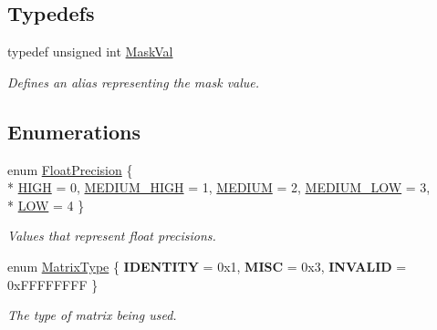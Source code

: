 \subsection*{Typedefs}
\begin{DoxyCompactItemize}
\item 
\hypertarget{group___scalar_math_consts_gad991473bd51363f9743013730e68751a}{}typedef unsigned int \hyperlink{group___scalar_math_consts_gad991473bd51363f9743013730e68751a}{Mask\+Val}\label{group___scalar_math_consts_gad991473bd51363f9743013730e68751a}

\begin{DoxyCompactList}\small\item\em Defines an alias representing the mask value. \end{DoxyCompactList}\end{DoxyCompactItemize}
\subsection*{Enumerations}
\begin{DoxyCompactItemize}
\item 
enum \hyperlink{group___scalar_math_consts_gae1c17f54b4cd35725ae7e4d54d5e8b8f}{Float\+Precision} \{ \\*
\hyperlink{group___scalar_math_consts_ggae1c17f54b4cd35725ae7e4d54d5e8b8fad850adf6415a0ab37b1c9fe6d3a50592}{H\+I\+G\+H} = 0, 
\hyperlink{group___scalar_math_consts_ggae1c17f54b4cd35725ae7e4d54d5e8b8faafc62be75ff50981d67b4fe3601020b3}{M\+E\+D\+I\+U\+M\+\_\+\+H\+I\+G\+H} = 1, 
\hyperlink{group___scalar_math_consts_ggae1c17f54b4cd35725ae7e4d54d5e8b8faae1748fe897ef72c65a32afb59edd9e9}{M\+E\+D\+I\+U\+M} = 2, 
\hyperlink{group___scalar_math_consts_ggae1c17f54b4cd35725ae7e4d54d5e8b8fab09c406decb8599d2aef4f9a60b7d46b}{M\+E\+D\+I\+U\+M\+\_\+\+L\+O\+W} = 3, 
\\*
\hyperlink{group___scalar_math_consts_ggae1c17f54b4cd35725ae7e4d54d5e8b8fa373b1e7676b2164a2da51003b901df10}{L\+O\+W} = 4
 \}
\begin{DoxyCompactList}\small\item\em Values that represent float precisions. \end{DoxyCompactList}\end{DoxyCompactItemize}
{\bf }\par
\begin{DoxyCompactItemize}
\item 
\hypertarget{group___s_i_s_d_mat_math_ga6c8951c82aec5015dd6806affb4c8d03}{}enum \hyperlink{group___s_i_s_d_mat_math_ga6c8951c82aec5015dd6806affb4c8d03}{Matrix\+Type} \{ {\bfseries I\+D\+E\+N\+T\+I\+T\+Y} = 0x1, 
{\bfseries M\+I\+S\+C} = 0x3, 
{\bfseries I\+N\+V\+A\+L\+I\+D} = 0x\+F\+F\+F\+F\+F\+F\+F\+F
 \}\label{group___s_i_s_d_mat_math_ga6c8951c82aec5015dd6806affb4c8d03}

\begin{DoxyCompactList}\small\item\em The type of matrix being used. \end{DoxyCompactList}\end{DoxyCompactItemize}


